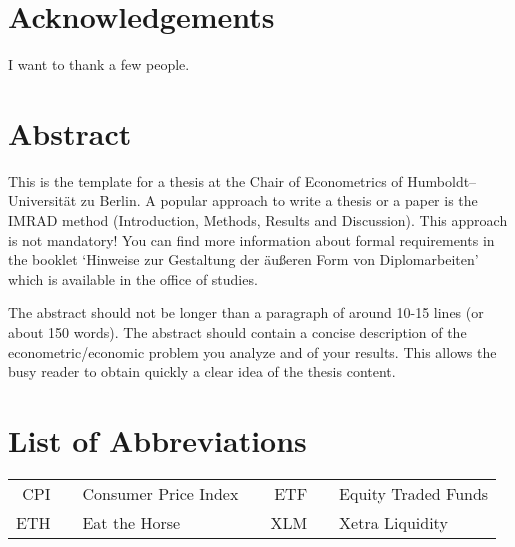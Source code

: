 \documentclass[a4paper,12pt]{article}
\begin{document}
\newpage
\hypertarget{acknowledgements}{%
\section*{Acknowledgements}\label{acknowledgements}}

I want to thank a few people.
\pagestyle{plain}
\setcounter{page}{1}    %

\newpage
\hypertarget{abstract}{%
\section*{Abstract}\label{abstract}}

This is the template for a thesis at the Chair of Econometrics of
Humboldt--Universität zu Berlin. A popular approach to write a thesis or a
paper is the IMRAD method (Introduction, Methods, Results and Discussion). This
approach is not mandatory! You can find more information about formal
requirements in the booklet `Hinweise zur Gestaltung der äußeren Form von
Diplomarbeiten' which is available in the office of studies.

The abstract should not be longer than a paragraph of around 10-15 lines (or
about 150 words). The abstract should contain a concise description of the
econometric/economic problem you analyze and of your results. This allows the
busy reader to obtain quickly a clear idea of the thesis content.

\newpage
\tableofcontents
\clearpage

\newpage
\hypertarget{list-of-abbreviations}{%
\section*{List of Abbreviations}\label{list-of-abbreviations}}
\begin{tabular}{rp{0.2cm}lp{1cm}rp{0.2cm}l}
    CPI     & &  Consumer Price Index   & & ETF     & &  Equity Traded Funds  \\
    ETH     & &  Eat the Horse          & & XLM     & &  Xetra Liquidity
\end{tabular}
\newlength{\cslhangindent}
\setlength{\cslhangindent}{1.5em}
\newenvironment{CSLReferences}%
  {}%
  {\par}
 
\end{document}
